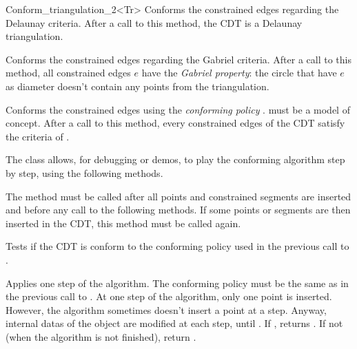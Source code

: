 \begin{ccRefClass}{Conform_triangulation_2<Tr>}
{ Conforms the constrained edges regarding the Delaunay criteria.
  After a call to this method, the CDT is a Delaunay triangulation. }

{ Conforms the constrained edges regarding the Gabriel criteria. After
  a call to this method, all constrained edges $e$ have the
  \emph{Gabriel property}: the circle that have $e$ as diameter
  doesn't contain any points from the triangulation. }

\begin{ccAdvanced}

         { Conforms the constrained edges using the \emph{conforming
             policy} .  must be a
           model of  concept. After a call to
           this method, every constrained edges of the CDT satisfy the
            criteria of . }

\end{ccAdvanced}

\begin{ccAdvanced}


The \ccRefName{} class allows, for debugging or demos, to play the
conforming algorithm step by step, using the following methods.

         { The method must be called after all points and constrained
           segments are inserted and before any call to the following
           methods. If some points or segments are then inserted 
           in the CDT, this method must be called again. }

{ Tests if the CDT is conform to the conforming policy used in the
  previous call to . }

         { Applies one step of the algorithm. The conforming policy
            must be the same as in the previous call
           to . At one step of the algorithm,
           only one point is inserted. However, the algorithm
           sometimes doesn't insert a point at a step. Anyway,
           internal datas of the \ccRefName{} object are modified at
           each step, until . If
           , returns . If not (when
           the algorithm is not finished), return .}

\end{ccAdvanced}

\end{ccRefClass}
